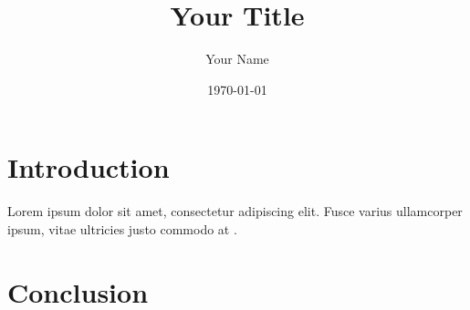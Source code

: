 \documentclass[a4paper,11pt]{article}
\begin{document}
	
	
	\title{Your Title}
	\author{Your Name}
	\date{\today}
	\maketitle
	\thispagestyle{empty} %
	
	
	\newpage
	\tableofcontents
	\newpage
	
	
	
	\newpage
	
	\section{Introduction}
	Lorem ipsum dolor sit amet, consectetur adipiscing elit. Fusce varius ullamcorper ipsum, vitae ultricies justo commodo at \cite{author2020example}.
	
	\section{Conclusion}	
	
	
	
	
\end{document}
